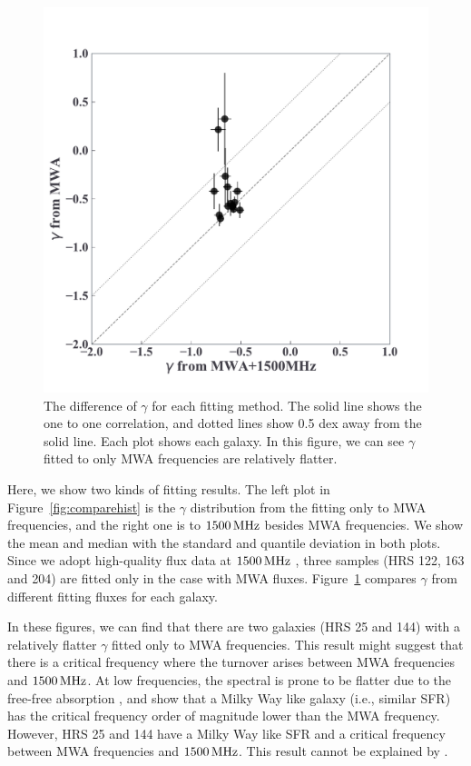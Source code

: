 \begin{figure}[htbp]
	\centering
	\includegraphics[width=.6\linewidth]{Chapter_5/Figures/Result_comparealpha.pdf}
    \caption[The comparison of $\gamma$ from different fitting methods]{\label{fig:comparegamma}
        The difference of $\gamma$ for each fitting method.
        The solid line shows the one to one correlation, and dotted lines show 0.5 dex away from the solid line.
        Each plot shows each galaxy.
        In this figure, we can see $\gamma$ fitted to only MWA frequencies are relatively flatter.
    }
\end{figure}

Here, we show two kinds of fitting results.
The left plot in Figure~\ref{fig:comparehist} is the $\gamma$ distribution from the fitting only to MWA frequencies, and the right one is to $1500\,\mathrm{MHz}$ besides MWA frequencies.
We show the mean and median with the standard and quantile deviation in both plots.
Since we adopt high-quality flux data at $1500\,\mathrm{MHz}$ \citep{Boselli2015}, three samples (HRS 122, 163 and 204) are fitted only in the case with MWA fluxes.
Figure~\ref{fig:comparegamma} compares $\gamma$ from different fitting fluxes for each galaxy.

In these figures, we can find that there are two galaxies (HRS 25 and 144) with a relatively flatter $\gamma$ fitted only to MWA frequencies.
This result might suggest that there is a critical frequency where the turnover arises between MWA frequencies and $1500\,\mathrm{MHz}$.
At low frequencies, the spectral is prone to be flatter due to the free-free absorption \citep[e.g.,][]{CalistroRivera2017a, Schober2017, Chyzy2018}, and \citet{Schober2017} show that a Milky Way like galaxy (i.e., similar SFR) has the critical frequency order of magnitude lower than the MWA frequency.
However, HRS 25 and 144 have a Milky Way like SFR \citep{Boselli2015} and a critical frequency between MWA frequencies and $1500\,\mathrm{MHz}$.
This result cannot be explained by \citet{Schober2017}.

